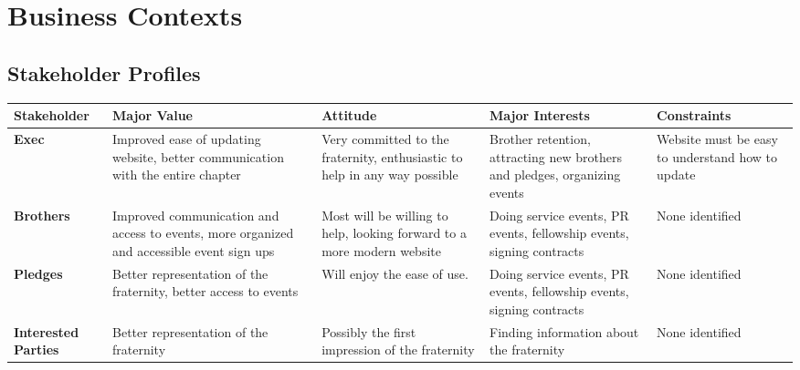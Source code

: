\documentclass[11pt,letterpaper,rotate]{article}
\begin{document}
\section{Business Contexts}

\subsection{Stakeholder Profiles}

\FloatBarrier
\begin{flushleft}
    \begin{longtable}{@{}|p{2.2cm}|p{3cm}|p{3cm}|p{3cm}|p{3cm}|}
        \hline
        {\bf Stakeholder}        & {\bf Major Value}
        & {\bf Attitude}
        & {\bf Major Interests}
        & {\bf Constraints}                                      \\ \hline
        {\bf Exec}               & Improved ease of updating website, better communication with the entire chapter           & Very committed to the fraternity, enthusiastic to help in any way possible & Brother retention, attracting new brothers and pledges, organizing events & Website must be easy to understand how to update \\ \hline
        {\bf Brothers}           & Improved communication and access to events, more organized and accessible event sign ups & Most will be willing to help, looking forward to a more modern website     & Doing service events, PR events, fellowship events, signing contracts     & None identified                                  \\ \hline
        {\bf Pledges}            & Better representation of the fraternity, better access to events                          & Will enjoy the ease of use.                                                & Doing service events, PR events, fellowship events, signing contracts     & None identified                                  \\ \hline
        {\bf Interested Parties} & Better representation of the fraternity                                                   & Possibly the first impression of the fraternity                            & Finding information about the fraternity                                  & None identified                                  \\
        \hline

\end{longtable}
\end{flushleft}
\FloatBarrier
\end{document}
